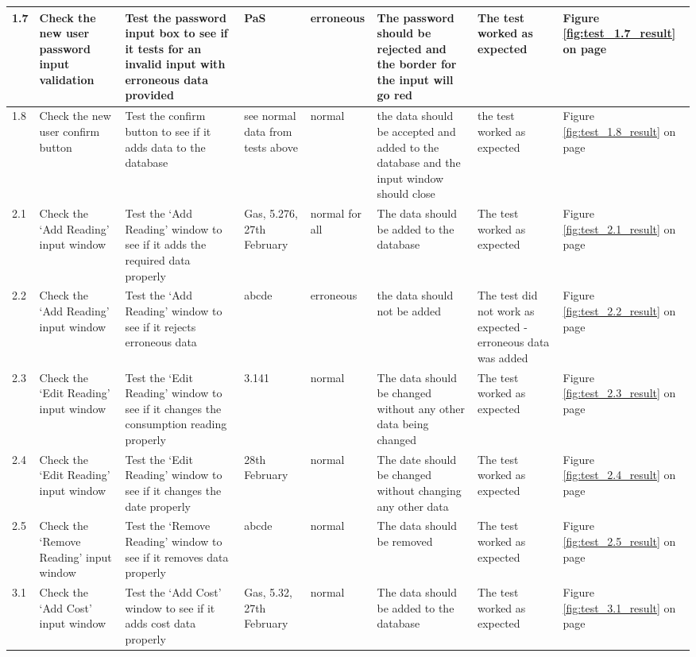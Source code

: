 \begin{landscape}
\begin{center}
\begin{longtable}{|p{1.5cm}|p{2.5cm}|p{2.5cm}|p{2cm}|p{2cm}|p{2cm}|p{2cm}|p{2cm}|}
       1.7 & Check the new user password input validation & Test the password input box to see if it tests for an invalid input with erroneous data provided & PaS & erroneous & The password should be rejected and the border for the input will go red & The test worked as expected & Figure \ref{fig:test_1.7_result} on page \pageref{fig:test_1.7_result}\\ \hline
       1.8 & Check the new user confirm button & Test the confirm button to see if it adds data to the database & see normal data from tests above & normal & the data should be accepted and added to the database and the input window should close & the test worked as expected & Figure \ref{fig:test_1.8_result} on page \pageref{fig:test_1.8_result}\\ \hline
       2.1 & Check the `Add Reading' input window & Test the `Add Reading' window to see if it adds the required data properly & Gas, 5.276, 27th February & normal for all & The data should be added to the database & The test worked as expected & Figure \ref{fig:test_2.1_result} on page \pageref{fig:test_2.1_result}\\ \hline
       2.2 & Check the `Add Reading' input window & Test the `Add Reading' window to see if it rejects erroneous data & abcde & erroneous & the data should not be added & The test did not work as expected - erroneous data was added & Figure \ref{fig:test_2.2_result} on page \pageref{fig:test_2.2_result} \\ \hline
       2.3 & Check the `Edit Reading' input window & Test the `Edit Reading' window to see if it changes the consumption reading properly & 3.141 & normal & The data should be changed without any other data being changed & The test worked as expected & Figure \ref{fig:test_2.3_result} on page \pageref{fig:test_2.3_result}\\ \hline
       2.4 & Check the `Edit Reading' input window & Test the `Edit Reading' window to see if it changes the date properly & 28th February & normal & The date should be changed without changing any other data & The test worked as expected & Figure \ref{fig:test_2.4_result} on page \pageref{fig:test_2.4_result}\\ \hline
       2.5 & Check the `Remove Reading' input window & Test the `Remove Reading' window to see if it removes data properly & abcde & normal & The data should be removed & The test worked as expected & Figure \ref{fig:test_2.5_result} on page \pageref{fig:test_2.5_result} \\ \hline
       3.1 & Check the `Add Cost' input window & Test the `Add Cost' window to see if it adds cost data properly & Gas, 5.32, 27th February & normal & The data should be added to the database & The test worked as expected & Figure \ref{fig:test_3.1_result} on page \pageref{fig:test_3.1_result} \\ \hline

\end{longtable}
\end{center}
\end{landscape}
